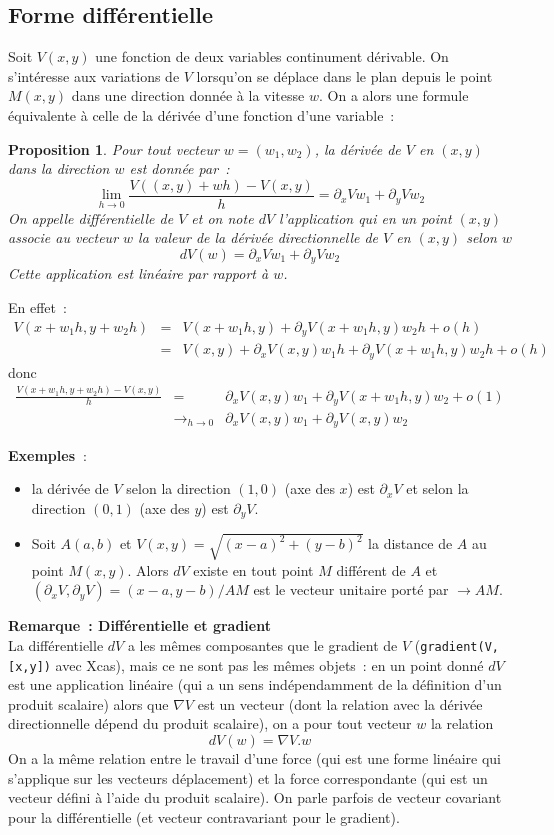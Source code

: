 \documentclass[a4paper,11pt]{article}
\newtheorem{prop}[thm]{Proposition}
\begin{document}
\subsection{Forme diff\'erentielle}
Soit $V(x,y)$ une fonction de deux variables continument d\'erivable.
On s'int\'eresse aux variations de $V$ lorsqu'on se d\'eplace dans le
plan depuis le point $M(x,y)$ dans une direction donn\'ee \`a
la vitesse $w$.
On a alors une formule \'equivalente \`a celle de 
la d\'eriv\'ee d'une fonction d'une variable~:
\begin{prop}
Pour tout vecteur $w=(w_1,w_2)$, la d\'eriv\'ee de $V$ en $(x,y)$
dans la direction $w$ est donn\'ee par~:
$$ \lim_{h\rightarrow 0} \frac{V((x,y)+wh)-V(x,y)}{h}=
\partial_xVw_1+\partial_yV w_2$$
On appelle diff\'erentielle 
de $V$ et on note $dV$ l'application
qui en un point $(x,y)$ associe au vecteur $w$ la valeur de la
d\'eriv\'ee directionnelle de $V$ en $(x,y)$ selon $w$
$$ dV(w)=\partial_xV w_1+\partial_yV w_2$$
Cette application est lin\'eaire par rapport \`a $w$.
\end{prop}
En effet~:
\begin{eqnarray*}
 V(x+w_1h,y+w_2h)&=&V(x+w_1h,y)+\partial_yV(x+w_1h,y) w_2h + o(h)\\
&=&V(x,y)+\partial_xV(x,y) w_1 h + \partial_yV(x+w_1h,y) w_2h + o(h)
\end{eqnarray*}
donc
\begin{eqnarray*}
 \frac{V(x+w_1h,y+w_2h)-V(x,y)}{h} & = &
\partial_xV(x,y) w_1 + \partial_yV(x+w_1h,y) w_2 +o(1) \\
&\rightarrow_{h\rightarrow 0} & \partial_xV(x,y) w_1
+ \partial_yV(x,y) w_2 
\end{eqnarray*}

{\bf Exemples~}: 
\begin{itemize}
\item la d\'eriv\'ee de $V$ selon la direction $(1,0)$ (axe des $x$)
est $\partial_xV$ et selon la direction $(0,1)$ (axe des $y$)
est $\partial_y V$.
\item Soit $A(a,b)$ et $V(x,y)=\sqrt{(x-a)^2+(y-b)^2}$ 
la distance de $A$ au point $M(x,y)$.
Alors $dV$ existe en tout point $M$ diff\'erent de $A$
et $(\partial_x V,\partial_y V)=(x-a,y-b)/AM$ est le vecteur
unitaire port\'e par $\rightarrow{AM}$.
\end{itemize}

{\bf Remarque~: Diff\'erentielle et gradient}\\
La diff\'erentielle $dV$ a les m\^emes composantes que
le gradient de $V$ (\verb|gradient(V,[x,y])| avec Xcas), 
mais ce ne sont pas les m\^emes objets~: 
en un point donn\'e
$dV$ est une application lin\'eaire (qui a un sens ind\'ependamment
de la d\'efinition d'un produit scalaire)
alors que $\nabla V$ est un vecteur (dont la relation
avec la d\'eriv\'ee directionnelle d\'epend du produit scalaire), 
on a pour tout vecteur $w$ la relation 
$$dV(w)=\nabla V. w $$
On a la m\^eme relation entre le travail d'une force (qui est une
forme lin\'eaire qui s'applique sur les vecteurs d\'eplacement) 
et la force correspondante (qui est un vecteur
d\'efini \`a l'aide du produit scalaire). On parle parfois de vecteur
covariant pour la diff\'erentielle (et vecteur contravariant pour le
gradient).
\end{document}
